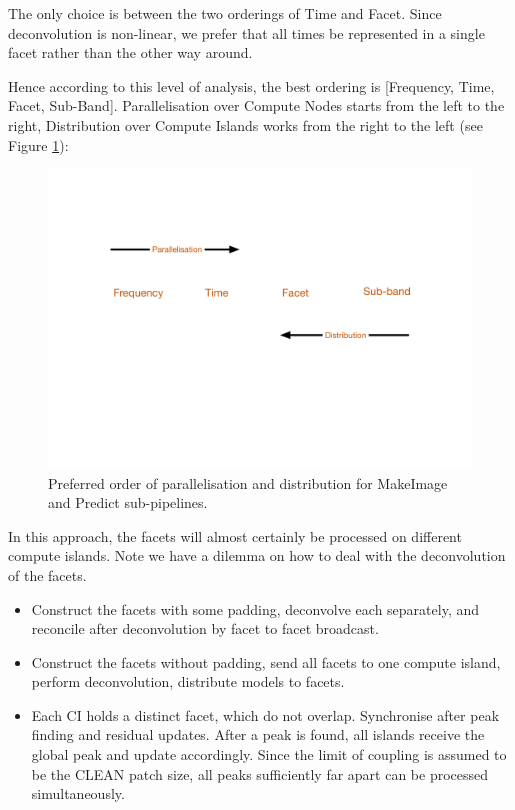 \documentclass[11pt,a4paper,variablewidth]{article}
\begin{document}
The only choice is between the two orderings of Time and Facet. Since deconvolution is non-linear, we prefer that all times be represented in a single facet rather than the other way around.

Hence according to this level of analysis, the best ordering is [Frequency, Time, Facet, Sub-Band]. Parallelisation over Compute Nodes starts from the left to the right, Distribution over Compute Islands works from the right to the left (see Figure \ref{fig:order}):

\begin{figure}[htb]
  \centering
  \includegraphics[width=\textwidth]{./Order.pdf}
  \caption{Preferred order of parallelisation and distribution for MakeImage and Predict sub-pipelines.}
  \label{fig:order}
\end{figure}

In this approach, the facets will almost certainly be processed on different compute islands. Note we have a dilemma on how to deal with the deconvolution of the facets.

\begin{itemize}	
\item Construct the facets with some padding, deconvolve each separately, and reconcile after deconvolution by facet to facet broadcast.
\item Construct the facets without padding, send all facets to one compute island, perform deconvolution, distribute models to facets. 
\item Each CI holds a distinct facet, which do not overlap. Synchronise after peak finding and residual updates. After a peak is found, all islands receive the global peak and update accordingly. Since the limit of coupling is assumed to be the CLEAN patch size, all peaks sufficiently far apart can be processed simultaneously.
\end{itemize}
\end{document}
